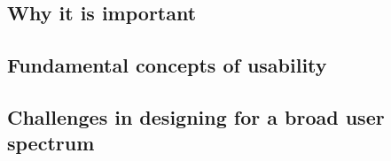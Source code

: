 \subsection{Why it is important}

\subsection{Fundamental concepts of usability}

\subsection{Challenges in designing for a broad user spectrum}

\newpage